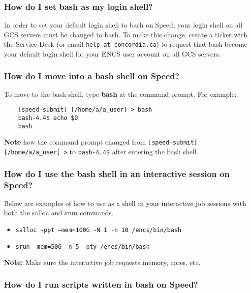 \subsubsection{How do I set bash as my login shell?}

In order to set your default login shell to bash on Speed, your login shell on all GCS servers must be changed to bash.
To make this change, create a ticket with the Service Desk (or email \texttt{help at concordia.ca}) to
request that bash become your default login shell for your ENCS user account on all GCS servers.

\subsubsection{How do I move into a bash shell on Speed?}

To move to the bash shell, type \textbf{bash} at the command prompt.
For example:
\begin{verbatim}
	[speed-submit] [/home/a/a_user] > bash
	bash-4.4$ echo $0
	bash
\end{verbatim}	

\textbf{Note} how the command prompt changed from \verb![speed-submit] [/home/a/a_user] >! to \verb!bash-4.4$! after entering the bash shell.

\subsubsection{How do I use the bash shell in an interactive session on Speed?}

Below are examples of how to use  as a shell in your interactive job sessions with
 both the salloc and srun commands.

\begin{itemize}
	\item \texttt{salloc -ppt --mem=100G -N 1 -n 10 /encs/bin/bash}
	\item \texttt{srun  --mem=50G -n 5 --pty /encs/bin/bash}
\end{itemize}

\textbf{Note:} Make sure the interactive job requests memory, cores, etc.
\subsubsection{How do I run scripts written in bash on Speed?}

